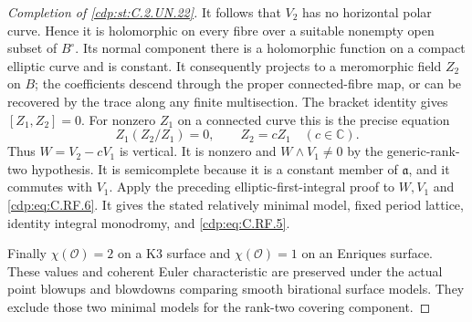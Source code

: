 \begin{proof}[Completion of \ref{cdp:st:C.2.UN.22}]
It follows that $V_2$ has no horizontal polar curve.
Hence it is holomorphic on every fibre over a suitable
nonempty open subset of $B^\circ$. Its normal component
there is a holomorphic function on a compact elliptic
curve and is constant. It consequently projects to a
meromorphic field $Z_2$ on $B$; the coefficients descend
through the proper connected-fibre map, or can be
recovered by the trace along any finite multisection.
The bracket identity gives $[Z_1,Z_2]=0$. For nonzero
$Z_1$ on a connected curve this is the precise equation
\[
              Z_1(Z_2/Z_1)=0,
              \qquad Z_2=cZ_1\quad(c\in\mathbb C).
                                                               \tag{C.RF.8}\label{cdp:eq:C.RF.8}
\]
Thus $W=V_2-cV_1$ is vertical. It is nonzero and
$W\wedge V_1\ne0$ by the generic-rank-two hypothesis.
It is semicomplete because it is a constant member of
$\mathfrak a$, and it commutes with $V_1$. Apply the
preceding elliptic-first-integral proof to $W,V_1$
and \eqref{cdp:eq:C.RF.6}. It gives the stated relatively minimal
model, fixed period lattice, identity integral monodromy,
and \eqref{cdp:eq:C.RF.5}.

Finally $\chi(\mathcal O)=2$ on a K3 surface and
$\chi(\mathcal O)=1$ on an Enriques surface. These
values and coherent Euler characteristic are preserved
under the actual point blowups and blowdowns comparing
smooth birational surface models. They exclude those
two minimal models for the rank-two covering component.
\end{proof}


